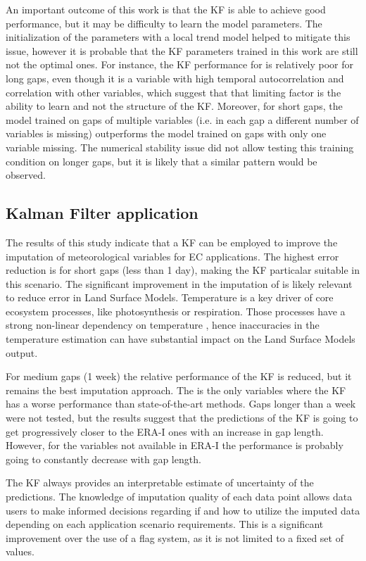 \documentclass{article}
\let\Oldsubsection\subsection
\renewcommand{\subsection}{\FloatBarrier\Oldsubsection}
\begin{document}
An important outcome of this work is that the KF is able to achieve good performance, but it may be difficulty to learn the  model parameters. The initialization of the parameters with a local trend model helped to mitigate this issue, however it is probable that the KF parameters trained in this work are still not the optimal ones. For instance, the KF performance for  is relatively poor for long gaps, even though it is a variable with high temporal autocorrelation and correlation with other variables, which suggest that that limiting factor is the ability to learn and not the structure of the KF. Moreover, for short gaps, the model trained on gaps of multiple variables (i.e. in each gap a different number of variables is missing) outperforms the model trained on gaps with only one variable missing. The numerical stability issue did not allow testing this training condition on longer gaps, but it is likely that a similar pattern would be observed.


\subsection{Kalman Filter application}

The results of this study indicate that a KF can be employed to improve the imputation of meteorological variables for EC applications.
The highest error reduction is for short gaps (less than 1 day), making the KF particalar suitable in this scenario. The significant improvement in the imputation of  is likely relevant to reduce error in Land Surface Models. Temperature is a key driver of core ecosystem processes, like photosynthesis or respiration. Those processes have a strong non-linear dependency on temperature \cite{bonan_climate_2019-2}, hence inaccuracies in the temperature estimation can have substantial impact on the Land Surface Models output.

For medium gaps (1 week) the relative performance of the KF is reduced, but it remains the best imputation approach. The  is the only variables where the KF has a worse performance than state-of-the-art methods.
Gaps longer than a week were not tested, but the results suggest that the predictions of the KF is going to get progressively closer to the ERA-I ones with an increase in gap length. However, for the variables not available in ERA-I the performance is probably going to constantly decrease with gap length.

The KF always provides an interpretable estimate of uncertainty of the predictions. The knowledge of imputation quality of each data point allows data users to make informed decisions regarding if and how to utilize the imputed data depending on each application scenario requirements. This is a significant improvement over the use of a flag system, as it is not limited to a fixed set of values.
\end{document}
